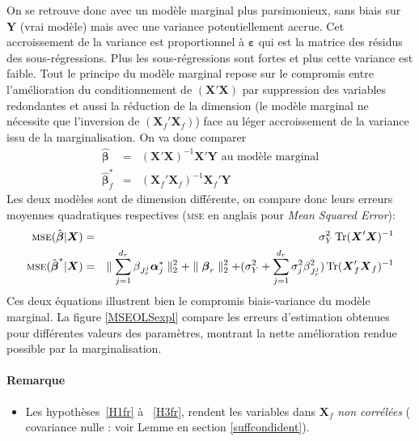 \documentclass[12pt,a4paper]{report}
\begin{document}
On se retrouve donc avec un modèle marginal plus parsimonieux, sans biais sur $\boldsymbol{Y}$ (vrai modèle) mais avec une variance potentiellement accrue. Cet accroissement de la variance est proportionnel à $\boldsymbol{\varepsilon}$ qui est la matrice des résidus des sous-régressions. Plus les sous-régressions sont fortes et plus cette variance est faible.
Tout le principe du modèle marginal repose sur le compromis entre l'amélioration du conditionnement de $(\boldsymbol{X}'\boldsymbol{X})$ par suppression des variables redondantes et aussi la réduction de la dimension (le modèle marginal ne nécessite que l'inversion de $(\boldsymbol{X}_{f}'\boldsymbol{X}_{f})$) face au léger accroissement de la variance issu de la marginalisation.
On va donc comparer 
	\begin{eqnarray}
		\hat{\boldsymbol{\beta}}&=& (\boldsymbol{X}'\boldsymbol{X})^{-1}\boldsymbol{X}'\boldsymbol{Y} \textrm{ au modèle marginal}  \nonumber \\
		\hat{\boldsymbol{\beta}}^*_f&=& (\boldsymbol{X}_{f}'\boldsymbol{X}_{f})^{-1}\boldsymbol{X}_{f}'\boldsymbol{Y}  \nonumber 
	\end{eqnarray}
	Les deux modèles sont de dimension différente, on compare donc leurs erreurs moyennes quadratiques respectives (\textsc{mse} en anglais pour {\it Mean Squared Error}):
	\begin{eqnarray}
		\textsc{mse}(\hat{\boldsymbol{\beta}}|\boldsymbol{X})&=& \sigma^2_Y \operatorname{Tr}(\boldsymbol{X}'\boldsymbol{X})^{-1}   \nonumber \\
		\textsc{mse}(\hat{\boldsymbol{\beta}}^*|\boldsymbol{X})&=&\parallel \sum_{j=1}^{d_r}\beta_{J_r^j}\boldsymbol{\alpha}_j^* \parallel_2^2+\parallel\boldsymbol{\beta}_r  \parallel_2^2 +(\sigma^2_Y+\sum_{j =1}^{d_r}\sigma^2_{j}\beta_{J_r^j}^2)\operatorname{Tr}(\boldsymbol{X}_f'\boldsymbol{X}_{f})^{-1} \nonumber 
	\end{eqnarray}
		Ces deux équations illustrent bien le compromis biais-variance du modèle marginal.
		La figure \ref{MSEOLSexpl} compare les erreurs d'estimation obtenues pour différentes valeurs des paramètres, montrant la nette amélioration rendue possible par la marginalisation.
		\paragraph{Remarque}
\begin{itemize}
\item Les hypothèses~\ref{H1fr}  à ~\ref{H3fr}, rendent les variables dans $\boldsymbol{X}_f$ {\it non corrélées} ( covariance nulle : voir Lemme en section \ref{suffcondident}).
\end{itemize} 
\end{document}

